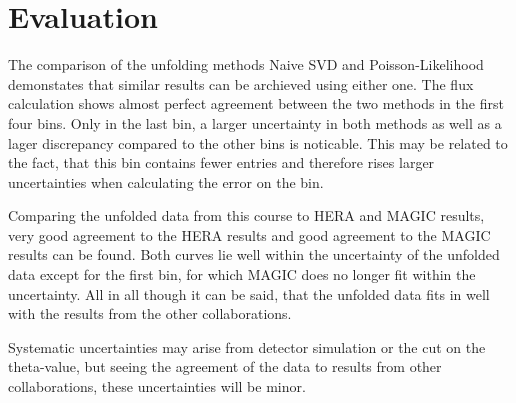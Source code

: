 \section{Evaluation}
\label{sec:diskussion}

The comparison of the unfolding methods Naive SVD and Poisson-Likelihood 
demonstates that similar results can be archieved using either one. The flux 
calculation shows almost perfect agreement between the two methods in the first 
four bins. Only in the last bin, a larger uncertainty in both methods as well as 
a lager discrepancy compared to the other bins is noticable. This may be 
related to the fact, that this bin contains fewer entries and therefore rises 
larger uncertainties when calculating the error on the bin. \par 

Comparing the unfolded data from this course to HERA and MAGIC results, very good 
agreement to the HERA results and good agreement to the MAGIC results can be 
found. Both curves lie well within the uncertainty of the unfolded data except 
for the first bin, for which MAGIC does no longer fit within the uncertainty. 
All in all though it can be said, that the unfolded data fits in well with the 
results from the other collaborations. \par 

Systematic uncertainties may arise from detector simulation or the cut on 
the theta-value, but seeing the agreement of the data to results from other 
collaborations, these uncertainties will be minor.